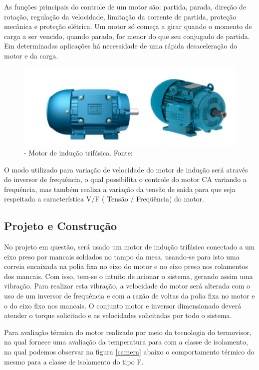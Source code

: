 As funções principais do controle de um motor são: partida, parada, direção de rotação, regulação da velocidade, limitação da corrente de partida, proteção mecânica e proteção elétrica. Um motor só começa a girar quando o momento de carga a ser vencido, quando parado, for menor do que seu conjugado de partida. Em determinadas aplicações há necessidade de uma rápida desaceleração do motor e da carga.

\begin{figure}[h!]
	\centering
		\includegraphics[keepaspectratio=true,scale=0.6]{figuras/2.png}
	\caption{- Motor de indução trifásica. Fonte: \cite{WEG}}
    \label{motor}
\end{figure}

O modo utilizado para variação de velocidade do motor de indução será através do inversor de frequência, o qual possibilita o controle do motor
CA variando a frequência, mas também realiza a variação da tensão de saída para que seja respeitada a característica V/F ( Tensão / Freqüência) do motor.

\subsection{Projeto e Construção}

No projeto em questão, será usado um motor de indução trifásico conectado a um eixo preso por mancais soldados no tampo da mesa, 
usando-se para isto uma correia encaixada na polia fixa no eixo do motor e no eixo preso nos rolamentos dos mancais. 
Com isso, tem-se o intuito de acionar o sistema, gerando assim uma vibração. Para realizar esta vibração, a velocidade do motor será 
alterada com o uso de um inversor de frequência e com a razão de voltas da polia fixa no motor e o do eixo fixo nos mancais. 
O conjunto motor e inversor dimensionado deverá atender o torque solicitado e as velocidades solicitadas por todo o sistema.

	Para avaliação térmica do motor realizado por meio da tecnologia do termovisor, na qual fornece uma avaliação da temperatura para com a classe de isolamento, na qual podemos observar na figura \ref{camera} abaixo o comportamento térmico do mesmo para a classe de isolamento do tipo F.

